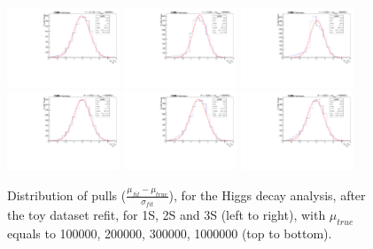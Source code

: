\begin{figure}[!htbp]
\begin{center}
\includegraphics[width=0.3\textwidth]{figures_and_tables/modeling_xchecks/plots/HToUpsilon1SPhoton_Cat0_signalStrenght_300000/pulls}
\includegraphics[width=0.3\textwidth]{figures_and_tables/modeling_xchecks/plots/HToUpsilon2SPhoton_Cat0_signalStrenght_300000/pulls}
\includegraphics[width=0.3\textwidth]{figures_and_tables/modeling_xchecks/plots/HToUpsilon3SPhoton_Cat0_signalStrenght_300000/pulls}
\includegraphics[width=0.3\textwidth]{figures_and_tables/modeling_xchecks/plots/HToUpsilon1SPhoton_Cat0_signalStrenght_1000000/pulls}
\includegraphics[width=0.3\textwidth]{figures_and_tables/modeling_xchecks/plots/HToUpsilon2SPhoton_Cat0_signalStrenght_1000000/pulls}
\includegraphics[width=0.3\textwidth]{figures_and_tables/modeling_xchecks/plots/HToUpsilon3SPhoton_Cat0_signalStrenght_1000000/pulls}
\end{center}
\caption{Distribution of pulls ($\frac{\mu_{fit} - \mu_{true}}{\sigma_{fit}}$), for the Higgs decay analysis, after the toy dataset refit, for 1S, 2S and 3S (left to right), with $\mu_{true}$ equals to 100000, 200000, 300000, 1000000 (top to bottom).}
\label{fig:modeling_xchecks_H}
\end{figure}


